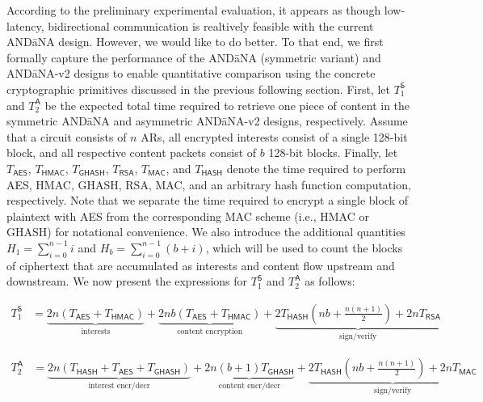 \documentclass[10pt]{article}
\begin{document}
According to the preliminary experimental evaluation, it appears as though low-latency, bidirectional communication is realtively feasible with the current {\sf AND\=aNA} design. However, we would like to do better. To that end, we first formally capture the performance of the {\sf AND\=aNA} (symmetric variant) and {\sf AND\=aNA-v2} designs to enable quantitative comparison using the concrete cryptographic primitives discussed in the previous following section. First, let $T_1^{\mathsf{S}}$ and $T_2^{\mathsf{A}}$ be the expected total time required to retrieve one piece of content in the symmetric {\sf AND\=aNA} and asymmetric {\sf AND\=aNA-v2} designs, respectively. Assume that a circuit consists of $n$ ARs, all encrypted interests consist of a single 128-bit block, and all respective content packets consist of $b$ 128-bit blocks. Finally, let $T_{\mathsf{AES}}$, $T_{\mathsf{HMAC}}$, $T_{\mathsf{GHASH}}$, $T_{\mathsf{RSA}}$, $T_{\mathsf{MAC}}$, and $T_{\mathsf{HASH}}$ denote the time required to perform AES, HMAC, GHASH, RSA, MAC, and an arbitrary hash function computation, respectively. Note that we separate the time required to encrypt a single block of plaintext with AES from the corresponding MAC scheme (i.e., HMAC or GHASH) for notational convenience. We also introduce the additional quantities $H_1 = \sum_{i=0}^{n-1}i$ and $H_b = \sum_{i=0}^{n-1}(b + i)$, which will be used to count the blocks of ciphertext that are accumulated as interests and content flow upstream and downstream. We now present the expressions for $T_1^{\mathsf{S}}$ and $T_2^{\mathsf{A}}$ as follows:

\begin{align*}
T_1^{\mathsf{S}} & = \underbrace{2n(T_{\mathsf{AES}} + T_{\mathsf{HMAC}}) }_{\text{interests}} + \underbrace{2nb(T_{\mathsf{AES}} + T_{\mathsf{HMAC}}) }_{\text{content encryption}} + \underbrace{2T_{\mathsf{HASH}}\left(nb + \frac{n(n+1)}{2}\right) + 2nT_{\mathsf{RSA}}}_{\text{sign/verify}}  %
\end{align*}

\begin{align*}
T_2^{\mathsf{A}} & = \underbrace{2n(T_{\mathsf{HASH}} + T_{\mathsf{AES}} + T_{\mathsf{GHASH}}) }_{\text{interest encr/decr}} + \underbrace{2n(b+1)T_{\mathsf{GHASH}} }_{\text{content encr/decr}} + \underbrace{2T_{\mathsf{HASH}}\left(nb + \frac{n(n+1)}{2}\right) + 2nT_{\mathsf{MAC}}}_{\text{sign/verify}}
\end{align*}
\end{document}
